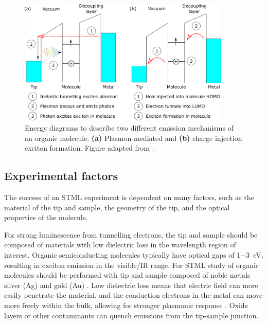 \begin{figure} [t]
    \centering
    \includegraphics[width=0.9\textwidth]{pictures/exciton_mechanisms.png}
    \caption[Energy diagrams to describe two different emission mechanisms of an organic molecule. \textbf{(a)} Plasmon-mediated and \textbf{(b)} charge injection exciton formation.]{Energy diagrams to describe two different emission mechanisms of an organic molecule. \textbf{(a)} Plasmon-mediated and \textbf{(b)} charge injection exciton formation. Figure adapted from \citep{kuhnke2017atomic}. }
    \label{fig:exptech:2-mechanisms}
\end{figure}



\subsection{Experimental factors}

The success of an \ac{STML} experiment is dependent on many factors, such as the material of the tip and sample, the geometry of the tip, and the optical properties of the molecule.

For strong luminescence from tunnelling electrons, the tip and sample should be composed of materials with low dielectric loss in the wavelength region of interest. Organic semiconducting molecules typically have optical gaps of 1\SI{-3}{eV}, resulting in exciton emission in the visible/IR range. For \ac{STML} study of organic molecules should be performed with tip and sample composed of noble metals silver (Ag) \citep{yang2015optical} and gold (Au) \citep{olmon2012optical}. Low dielectric loss means that electric field can more easily penetrate the material, and the conduction electrons in the metal can move more freely within the bulk, allowing for stronger plasmonic response \citep{novotny2012principles}. Oxide layers or other contaminants can quench emissions from the tip-sample junction.

